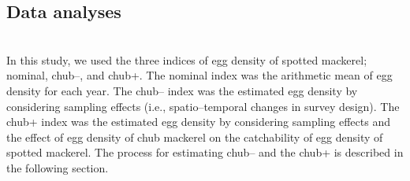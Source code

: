 \documentclass[12pt]{article}
\begin{document}
\begin{linenumbers}
{\subsection{Data analyses}
\\
In this study, we used the three indices of egg density of spotted mackerel; nominal, chub--, and chub+. The nominal index was the arithmetic mean of egg density for each year. The chub-- index was the estimated egg density by considering sampling effects (i.e., spatio--temporal changes in survey design). The chub+ index was the estimated egg density by considering sampling effects and the effect of egg density of chub mackerel on the catchability of egg density of spotted mackerel. The process for estimating chub-- and the chub+ is described in the following section.

}
\end{linenumbers}
\end{document}

